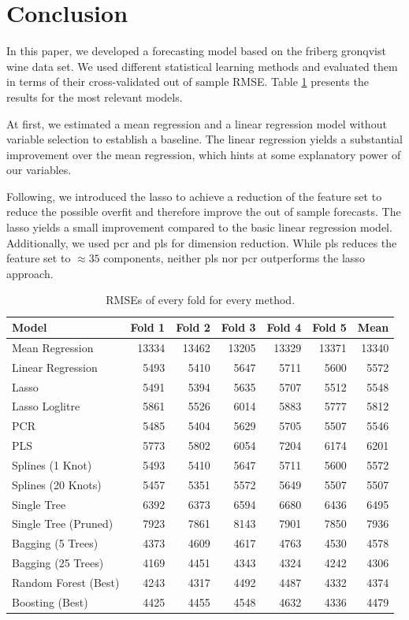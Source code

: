\documentclass[11pt,]{article}
\begin{document}
\hypertarget{conclusion}{%
\section{\texorpdfstring{Conclusion
\label{chap:conc}}{Conclusion }}\label{conclusion}}

In this paper, we developed a forecasting model based on the friberg
gronqvist wine data set. We used different statistical learning methods
and evaluated them in terms of their cross-validated out of sample
\ac{RMSE}. Table \ref{tab:RMSESum} presents the results for the most
relevant models.

At first, we estimated a mean regression and a linear regression model
without variable selection to establish a baseline. The linear
regression yields a substantial improvement over the mean regression,
which hints at some explanatory power of our variables.

Following, we introduced the \ac{lasso} to achieve a reduction of the
feature set to reduce the possible overfit and therefore improve the out
of sample forecasts. The lasso yields a small improvement compared to
the basic linear regression model. Additionally, we used \ac{pcr} and
\ac{pls} for dimension reduction. While \ac{pls} reduces the feature set
to \(\approx35\) components, neither \ac{pls} nor \ac{pcr} outperforms
the \ac{lasso} approach.

\begin{table}[t]

\caption{\label{tab:RMSE}\label{tab:RMSESum}RMSEs of every fold for every method.}
\centering
\begin{tabular}{lrrrrrr}
\toprule
Model & Fold 1 & Fold 2 & Fold 3 & Fold 4 & Fold 5 & Mean\\
\midrule
Mean Regression & 13334 & 13462 & 13205 & 13329 & 13371 & 13340\\
Linear Regression & 5493 & 5410 & 5647 & 5711 & 5600 & 5572\\
Lasso & 5491 & 5394 & 5635 & 5707 & 5512 & 5548\\
Lasso Loglitre & 5861 & 5526 & 6014 & 5883 & 5777 & 5812\\
PCR & 5485 & 5404 & 5629 & 5705 & 5507 & 5546\\
\addlinespace
PLS & 5773 & 5802 & 6054 & 7204 & 6174 & 6201\\
Splines (1 Knot) & 5493 & 5410 & 5647 & 5711 & 5600 & 5572\\
Splines (20 Knots) & 5457 & 5351 & 5572 & 5649 & 5507 & 5507\\
Single Tree & 6392 & 6373 & 6594 & 6680 & 6436 & 6495\\
Single Tree (Pruned) & 7923 & 7861 & 8143 & 7901 & 7850 & 7936\\
\addlinespace
Bagging (5 Trees) & 4373 & 4609 & 4617 & 4763 & 4530 & 4578\\
Bagging (25 Trees) & 4169 & 4451 & 4343 & 4324 & 4242 & 4306\\
Random Forest (Best) & 4243 & 4317 & 4492 & 4487 & 4332 & 4374\\
Boosting (Best) & 4425 & 4455 & 4548 & 4632 & 4336 & 4479\\
\bottomrule
\end{tabular}
\end{table}
\end{document}
